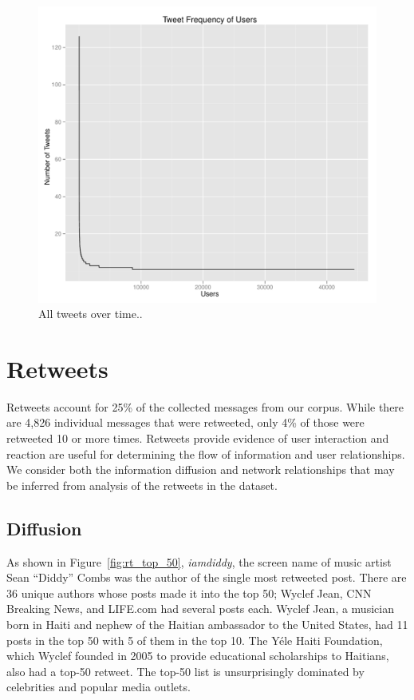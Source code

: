 \documentclass[a4paper, 11pt, titlepage]{article}
\begin{document}
\begin{figure}[h]
\centering
\includegraphics[width=120mm]{../figures/all_tweets_by_users}
\caption{All tweets over time..}
\label{fig:all_tweets_by_users}
\end{figure}

\section{Retweets}

Retweets account for 25\% of the collected messages from our corpus.  While there are 4,826 individual messages that were retweeted, only 4\% of those were retweeted 10 or more times.  Retweets provide evidence of user interaction and reaction are useful for determining the flow of information and user relationships.  We consider both the information diffusion and network relationships that may be inferred from analysis of the retweets in the dataset.

\subsection{Diffusion}

As shown in Figure~\ref{fig:rt_top_50}, \textit{iamdiddy}, the screen name of music artist Sean ``Diddy'' Combs was the author of the single most retweeted post.  There are 36 unique authors whose posts made it into the top 50; Wyclef Jean, CNN Breaking News, and LIFE.com had several posts each.  Wyclef Jean, a musician born in Haiti and nephew of the Haitian ambassador to the United States, had 11 posts in the top 50 with 5 of them in the top 10.  The Y\'{e}le Haiti Foundation, which Wyclef founded in 2005 to provide educational scholarships to Haitians, also had a top-50 retweet.  The top-50 list is unsurprisingly dominated by celebrities and popular media outlets.
\end{document}
